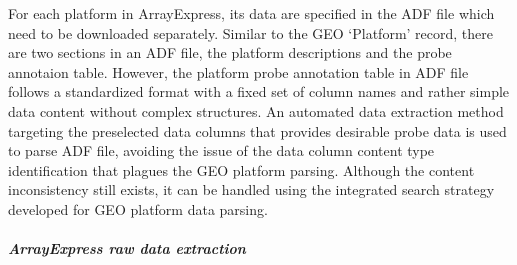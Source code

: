 For each platform in ArrayExpress, its data are specified in the ADF file
which need to be downloaded separately.
%
Similar to the GEO `Platform' record, there are two sections in an ADF file,
the platform descriptions and the probe annotaion table.
%
However, the platform probe annotation table in ADF file follows a
standardized format with a fixed set of column names and rather simple
data content without complex structures.
%
An automated data extraction method targeting the preselected data
columns that provides desirable probe data is used to parse ADF file,
avoiding the issue of the data column content type identification that
plagues the GEO platform parsing.
%
Although the content inconsistency still exists, it can be handled using
the integrated search strategy developed for GEO platform data parsing.




\subparagraph{ArrayExpress raw data extraction}

% 
%
%

